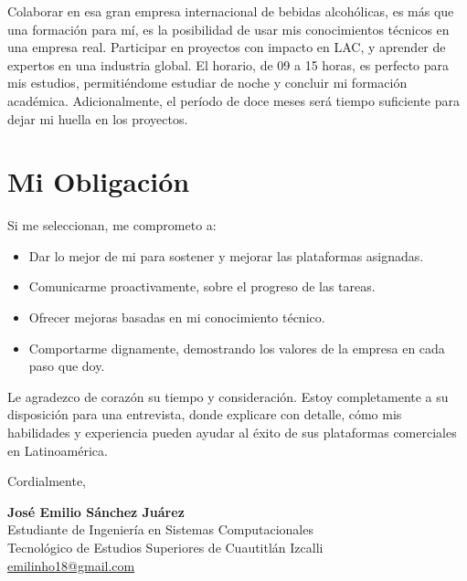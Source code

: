 \documentclass[letterpaper,11pt]{article}
\begin{document}
Colaborar en esa gran empresa internacional de bebidas alcohólicas, es más que una formación para mí, es la posibilidad de usar mis conocimientos técnicos en una empresa real. Participar en proyectos con impacto en LAC, y aprender de expertos en una industria global. El horario, de 09 a 15 horas, es perfecto para mis estudios, permitiéndome estudiar de noche y concluir mi formación académica. Adicionalmente, el período de doce meses será tiempo suficiente para dejar mi huella en los proyectos.

\section*{Mi Obligación}

Si me seleccionan, me comprometo a:
\begin{itemize}
\item Dar lo mejor de mi para sostener y mejorar las plataformas asignadas.
\item Comunicarme proactivamente, sobre el progreso de las tareas.
\item Ofrecer mejoras basadas en mi conocimiento técnico.
\item Comportarme dignamente, demostrando los valores de la empresa en cada paso que doy.
\end{itemize}

Le agradezco de corazón su tiempo y consideración. Estoy completamente a su disposición para una entrevista, donde explicare con detalle, cómo mis habilidades y experiencia pueden ayudar al éxito de sus plataformas comerciales en Latinoamérica.

\vspace{0.5cm}

\noindent Cordialmente,

\vspace{0.8cm}

\noindent \textbf{José Emilio Sánchez Juárez} \\
Estudiante de Ingeniería en Sistemas Computacionales \\
Tecnológico de Estudios Superiores de Cuautitlán Izcalli \\
\href{mailto:emilinho18@gmail.com}{emilinho18@gmail.com}
\end{document}
